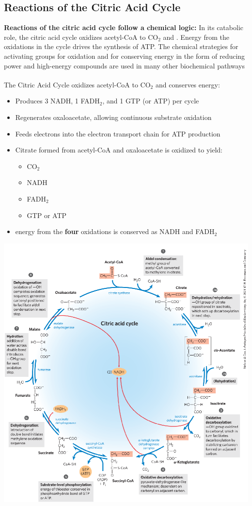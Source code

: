 \documentclass[10pt]{article}
\newcommand{\water}{\text{H$_2$O}}
\begin{document}
\subsection*{Reactions of the Citric Acid Cycle}
\textbf{Reactions of the citric acid cycle follow a chemical logic:}  In its catabolic role, the citric acid cycle oxidizes acetyl-CoA to CO$_2$ and \water.  Energy from the oxidations in the cycle drives the synthesis of ATP.  The chemical strategies for activating groups for oxidation and for conserving energy in the form of reducing power and high-energy compounds are used in many other biochemical pathways\\\\
The Citric Acid Cycle oxidizes acetyl-CoA to CO$_2$ and conserves energy:
\begin{itemize}
	\item Produces 3 NADH, 1 FADH$_2$, and 1 GTP (or ATP) per cycle
	\item Regenerates oxaloacetate, allowing continuous substrate oxidation
	\item Feeds electrons into the electron transport chain for ATP production
	\item Citrate formed from acetyl-CoA and oxaloacetate is oxidized to yield:
	\begin{itemize}
        \item CO$_2$
        \item NADH
        \item FADH$_2$
        \item GTP or ATP
    \end{itemize}
    \item energy from the \textbf{four} oxidations is conserved as NADH and FADH$_2$
\end{itemize}
\begin{center} 
	\includegraphics*[width=\textwidth]{L3_19.png}
\end{center}
\end{document}
